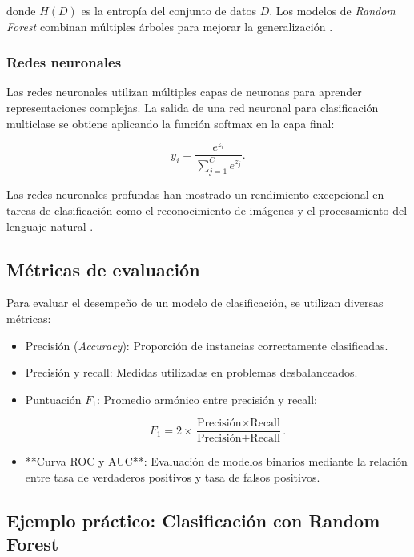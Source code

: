 \begin{itemize}
		donde \( H(D) \) es la entropía del conjunto de datos \( D \). Los modelos de \textit{Random Forest} combinan múltiples árboles para mejorar la generalización \cite{breiman2001random}.
		
		\subsubsection{Redes neuronales}
		
		Las redes neuronales utilizan múltiples capas de neuronas para aprender representaciones complejas. La salida de una red neuronal para clasificación multiclase se obtiene aplicando la función softmax en la capa final:
		
		\begin{equation}
			y_i = \frac{e^{z_i}}{\sum_{j=1}^{C} e^{z_j}}.
		\end{equation}
		
		Las redes neuronales profundas han mostrado un rendimiento excepcional en tareas de clasificación como el reconocimiento de imágenes y el procesamiento del lenguaje natural \cite{goodfellow2016deep}.
		
		\subsection{Métricas de evaluación}
		
		Para evaluar el desempeño de un modelo de clasificación, se utilizan diversas métricas:
		
		\begin{itemize}
			\item Precisión (\textit{Accuracy}): Proporción de instancias correctamente clasificadas.
			\item Precisión y recall: Medidas utilizadas en problemas desbalanceados.
			\item Puntuación \( F_1 \): Promedio armónico entre precisión y recall:
			
			\begin{equation}
				F_1 = 2 \times \frac{\text{Precisión} \times \text{Recall}}{\text{Precisión} + \text{Recall}}.
			\end{equation}
			
			\item **Curva ROC y AUC**: Evaluación de modelos binarios mediante la relación entre tasa de verdaderos positivos y tasa de falsos positivos.
		\end{itemize}
		
		\subsection{Ejemplo práctico: Clasificación con Random Forest}
		

\end{itemize}
